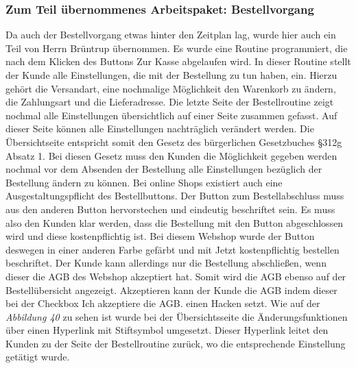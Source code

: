 \subsubsection{Zum Teil übernommenes Arbeitspaket: Bestellvorgang}
Da auch der Bestellvorgang etwas hinter den Zeitplan lag, wurde hier auch ein Teil von Herrn Brüntrup übernommen. Es wurde eine Routine programmiert, die nach dem Klicken des Buttons \glqq Zur Kasse\grqq{} abgelaufen wird. In dieser Routine stellt der Kunde alle Einstellungen, die mit der Bestellung zu tun haben, ein. Hierzu gehört die Versandart, eine nochmalige Möglichkeit den Warenkorb zu ändern, die Zahlungsart und die Lieferadresse. Die letzte Seite der Bestellroutine zeigt nochmal alle Einstellungen übersichtlich auf einer Seite zusammen gefasst. Auf dieser Seite können alle Einstellungen nachträglich verändert werden. Die Übersichtseite entspricht somit den Gesetz des bürgerlichen Gesetzbuches §312g Absatz 1. Bei diesen Gesetz muss den Kunden die Möglichkeit gegeben werden nochmal vor dem Absenden der Bestellung alle Einstellungen bezüglich der Bestellung ändern zu können. Bei online Shops existiert auch eine \glqq Ausgestaltungspflicht des Bestellbuttons\grqq{}. Der Button zum Bestellabschluss muss aus den anderen Button hervorstechen und eindeutig beschriftet sein. Es muss also den Kunden klar werden, dass die Bestellung mit den Button abgeschlossen wird und diese kostenpflichtig ist. Bei diesem Webshop wurde der Button deswegen in einer anderen Farbe gefärbt und mit \glqq Jetzt kostenpflichtig bestellen\grqq{} beschriftet. Der Kunde kann allerdings nur die Bestellung abschließen, wenn dieser die AGB des Webshop akzeptiert hat. Somit wird die AGB ebenso auf der Bestellübersicht angezeigt. Akzeptieren kann der Kunde die AGB indem dieser bei der Checkbox \glqq Ich akzeptiere die AGB.\grqq{} einen Hacken setzt. Wie auf der \textit{Abbildung 40} zu sehen ist wurde bei der Übersichtsseite die Änderungsfunktionen über einen Hyperlink mit Stiftsymbol umgesetzt. Dieser Hyperlink leitet den Kunden zu der Seite der Bestellroutine zurück, wo die entsprechende Einstellung getätigt wurde.

